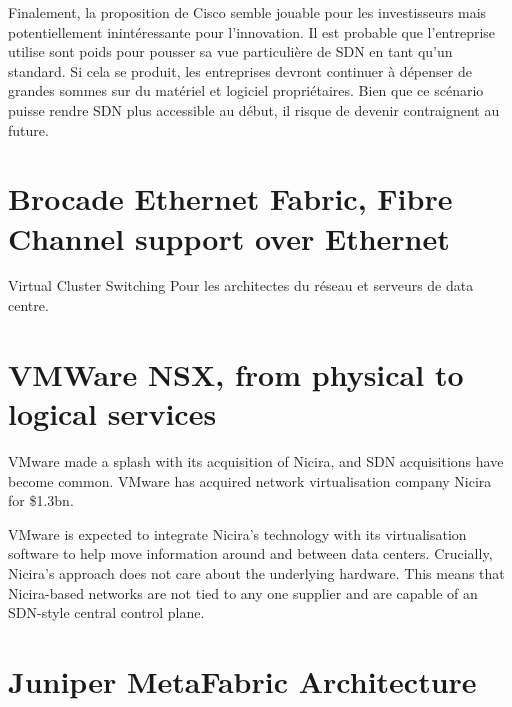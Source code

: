 
Finalement, la proposition de Cisco semble jouable pour les investisseurs mais potentiellement inintéressante pour l'innovation. Il est probable que l'entreprise utilise sont poids pour pousser sa vue particulière de SDN en tant qu'un standard. Si cela se produit, les entreprises devront continuer à dépenser de grandes sommes sur du matériel et logiciel propriétaires. Bien que ce scénario puisse rendre SDN plus accessible au début, il risque de devenir contraignent au future. \cite{ExecutiveGuideToSDNCisco}


\section{Brocade Ethernet Fabric, Fibre Channel support over Ethernet}
Virtual Cluster Switching
Pour les architectes du réseau et serveurs de data centre.

\section{VMWare NSX, from physical to logical services}
VMware made a splash with its acquisition of Nicira, and SDN acquisitions have become common.
VMware has acquired network virtualisation company Nicira for \$1.3bn.

VMware is expected to integrate Nicira’s technology with its virtualisation software to help move information around and between data centers. Crucially, Nicira’s approach does not care about the underlying hardware. This means that Nicira-based networks are not tied to any one supplier and are capable of an SDN-style central control plane.



\section{Juniper MetaFabric Architecture}

